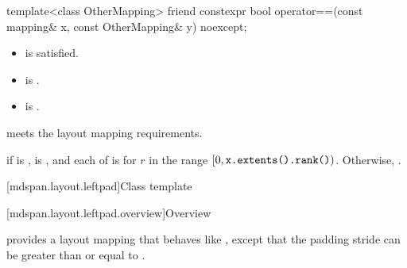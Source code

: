 %
\begin{itemdecl}
template<class OtherMapping>
  friend constexpr bool operator==(const mapping& x, const OtherMapping& y) noexcept;
\end{itemdecl}

\begin{itemdescr}
\pnum
\constraints
\begin{itemize}
\item
{} is satisfied.
\item
{} is .
\item
{} is .
\end{itemize}

\pnum
\expects
{} meets the layout mapping requirements.

\pnum
\returns
{} if  is ,
 is , and
each of  is 
for $r$ in the range  $[0, \texttt{\protect x.extents().rank()})$.
Otherwise, .
\end{itemdescr}

[mdspan.layout.leftpad]{Class template }

[mdspan.layout.leftpad.overview]{Overview}

\pnum
{} provides a layout mapping
that behaves like ,
except that the padding stride 
can be greater than or equal to .


